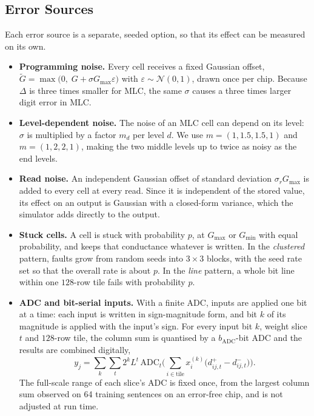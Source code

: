 \subsection{Error Sources}
Each error source is a separate, seeded option, so that its effect can be measured on its own.
\begin{itemize}
\item \textbf{Programming noise.} Every cell receives a fixed Gaussian offset,
$\tilde G=\max\!\big(0,\;G+\sigma G_{\max}\varepsilon\big)$ with $\varepsilon\sim\mathcal N(0,1)$, drawn
once per chip. Because $\Delta$ is three times smaller for MLC, the same $\sigma$ causes a three times
larger digit error in MLC.

\item \textbf{Level-dependent noise.} The noise of an MLC cell can depend on its level: $\sigma$ is
multiplied by a factor $m_d$ per level $d$. We use $m=(1,1.5,1.5,1)$ and $m=(1,2,2,1)$, making the two
middle levels up to twice as noisy as the end levels.

\item \textbf{Read noise.} An independent Gaussian offset of standard deviation $\sigma_r G_{\max}$ is
added to every cell at every read. Since it is independent of the stored value, its effect on an output
is Gaussian with a closed-form variance, which the simulator adds directly to the output.

\item \textbf{Stuck cells.} A cell is stuck with probability $p$, at $G_{\max}$ or $G_{\min}$ with equal
probability, and keeps that conductance whatever is written. In the \emph{clustered} pattern, faults
grow from random seeds into $3\times3$ blocks, with the seed rate set so that the overall rate is about
$p$. In the \emph{line} pattern, a whole bit line within one $128$-row tile fails with probability $p$.

\item \textbf{ADC and bit-serial inputs.} With a finite ADC, inputs are applied one bit at a time:
each input is written in sign-magnitude form, and bit $k$ of its magnitude is applied with the input's
sign. For every input bit $k$, weight slice $t$ and $128$-row tile, the column sum is quantised by a
$b_{\text{ADC}}$-bit ADC and the results are combined digitally,
\begin{equation}
y_j=\sum_{k}\sum_{t}2^{k}L^{t}\,\mathrm{ADC}_t\!\Big(\sum_{i\in\text{tile}}x_i^{(k)}\big(d^{+}_{ij,t}-d^{-}_{ij,t}\big)\Big).
\label{eq:adc}
\end{equation}
The full-scale range of each slice's ADC is fixed once, from the largest column sum observed on 64
training sentences on an error-free chip, and is not adjusted at run time.


\end{itemize}
